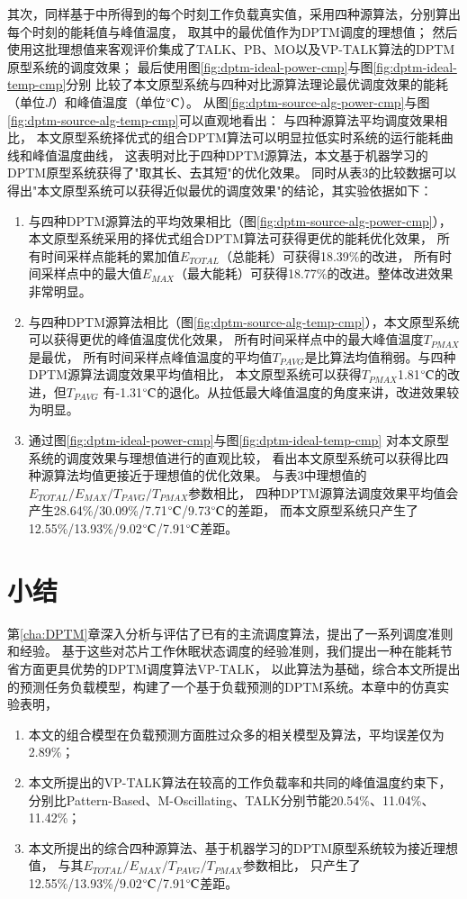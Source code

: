 其次，同样基于中所得到的每个时刻工作负载真实值，采用四种源算法，分别算出每个时刻的能耗值与峰值温度， 取其中的最优值作为DPTM调度的理想值； 然后使用这批理想值来客观评价集成了TALK、PB、MO以及VP-TALK算法的DPTM原型系统的调度效果； 最后使用图\ref{fig:dptm-ideal-power-cmp}与图\ref{fig:dptm-ideal-temp-cmp}分别 比较了本文原型系统与四种对比源算法理论最优调度效果的能耗（单位$J$）和峰值温度（单位$\celsius$）。
从图\ref{fig:dptm-source-alg-power-cmp}与图\ref{fig:dptm-source-alg-temp-cmp}可以直观地看出： 与四种源算法平均调度效果相比， 本文原型系统择优式的组合DPTM算法可以明显拉低实时系统的运行能耗曲线和峰值温度曲线， 这表明对比于四种DPTM源算法，本文基于机器学习的DPTM原型系统获得了"取其长、去其短"的优化效果。 同时从表3的比较数据可以得出"本文原型系统可以获得近似最优的调度效果"的结论，其实验依据如下：
\begin{enumerate}[1)]
\item 与四种DPTM源算法的平均效果相比（图\ref{fig:dptm-source-alg-power-cmp}）， 本文原型系统采用的择优式组合DPTM算法可获得更优的能耗优化效果， 所有时间采样点能耗的累加值$E_{TOTAL}$（总能耗）可获得18.39\%的改进， 所有时间采样点中的最大值$E_{MAX}$（最大能耗）可获得18.77\%的改进。整体改进效果非常明显。
\item 与四种DPTM源算法相比（图\ref{fig:dptm-source-alg-temp-cmp}），本文原型系统可以获得更优的峰值温度优化效果， 所有时间采样点中的最大峰值温度$T_{PMAX}$是最优， 所有时间采样点峰值温度的平均值$T_{PAVG}$是比算法均值稍弱。与四种DPTM源算法调度效果平均值相比， 本文原型系统可以获得$T_{PMAX}$1.81$\celsius$的改进，但$T_{PAVG}$ 有-1.31$\celsius$的退化。从拉低最大峰值温度的角度来讲，改进效果较为明显。
\item 通过图\ref{fig:dptm-ideal-power-cmp}与图\ref{fig:dptm-ideal-temp-cmp} 对本文原型系统的调度效果与理想值进行的直观比较， 看出本文原型系统可以获得比四种源算法均值更接近于理想值的优化效果。 与表3中理想值的$E_{TOTAL}/E_{MAX}/T_{PAVG}/T_{PMAX}$参数相比， 四种DPTM源算法调度效果平均值会产生28.64\%/30.09\%/7.71$\celsius$/9.73$\celsius$的差距， 而本文原型系统只产生了12.55\%/13.93\%/9.02$\celsius$/7.91$\celsius$差距。
\end{enumerate}

\section{小结}
第\ref{cha:DPTM}章深入分析与评估了已有的主流调度算法，提出了一系列调度准则和经验。 基于这些对芯片工作休眠状态调度的经验准则，我们提出一种在能耗节省方面更具优势的DPTM调度算法VP-TALK， 以此算法为基础，综合本文所提出的预测任务负载模型，构建了一个基于负载预测的DPTM系统。本章中的仿真实验表明，
\begin{enumerate}[1)]
\item 本文的组合模型在负载预测方面胜过众多的相关模型及算法，平均误差仅为2.89\%；
\item 本文所提出的VP-TALK算法在较高的工作负载率和共同的峰值温度约束下， 分别比Pattern-Based、M-Oscillating、TALK分别节能20.54\%、11.04\%、11.42\%；
\item 本文所提出的综合四种源算法、基于机器学习的DPTM原型系统较为接近理想值， 与其$E_{TOTAL}/E_{MAX}/T_{PAVG}/T_{PMAX}$参数相比， 只产生了12.55\%/13.93\%/9.02$\celsius$/7.91$\celsius$差距。
\end{enumerate}
